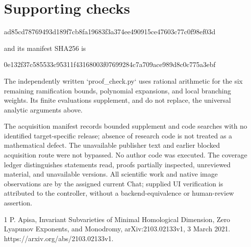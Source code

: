 \documentclass[10pt]{article}
\begin{document}
\section*{Supporting checks}
ad85cd78769493d189f7cb8fa19683f3a374ee490915ce47603c77c0f98ef03d\par
and its manifest SHA256 is\par
0e132f37c585533c95311f43168003f07699284c7a709ace989d8c0c775a3ebf\par
The independently written `proof\_check.py` uses rational arithmetic for the six remaining ramification bounds, polynomial expansions, and local branching weights. Its finite evaluations supplement, and do not replace, the universal analytic arguments above.\par
The acquisition manifest records bounded supplement and code searches with no identified target-specific release; absence of research code is not treated as a mathematical defect. The unavailable publisher text and earlier blocked acquisition route were not bypassed. No author code was executed. The coverage ledger distinguishes statements read, proofs partially inspected, unreviewed material, and unavailable versions. All scientific work and native image observations are by the assigned current Chat; supplied UI verification is attributed to the controller, without a backend-equivalence or human-review assertion.\par
1 P. Apisa, Invariant Subvarieties of Minimal Homological Dimension, Zero Lyapunov Exponents, and Monodromy, arXiv:2103.02133v1, 3 March 2021. https://arxiv.org/abs/2103.02133v1.\par
\end{document}
